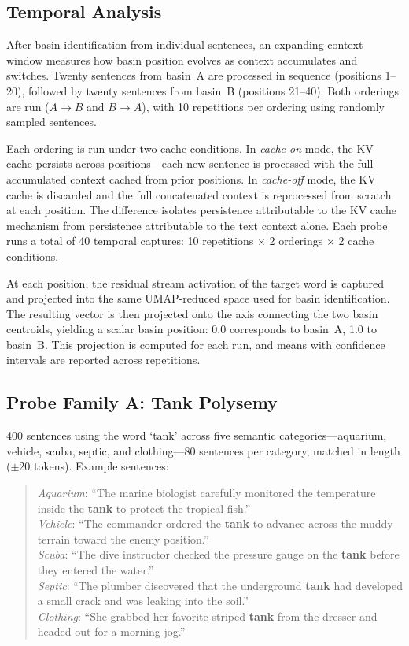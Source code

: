 \documentclass[11pt,a4paper]{article}
\begin{document}
\subsection{Temporal Analysis}

After basin identification from individual sentences, an expanding context window measures how basin position evolves as context accumulates and switches. Twenty sentences from basin~A are processed in sequence (positions 1--20), followed by twenty sentences from basin~B (positions 21--40). Both orderings are run ($A \to B$ and $B \to A$), with 10 repetitions per ordering using randomly sampled sentences.

Each ordering is run under two cache conditions. In \emph{cache-on} mode, the KV cache persists across positions---each new sentence is processed with the full accumulated context cached from prior positions. In \emph{cache-off} mode, the KV cache is discarded and the full concatenated context is reprocessed from scratch at each position. The difference isolates persistence attributable to the KV cache mechanism from persistence attributable to the text context alone. Each probe runs a total of 40 temporal captures: 10 repetitions $\times$ 2 orderings $\times$ 2 cache conditions.

At each position, the residual stream activation of the target word is captured and projected into the same UMAP-reduced space used for basin identification. The resulting vector is then projected onto the axis connecting the two basin centroids, yielding a scalar basin position: 0.0 corresponds to basin~A, 1.0 to basin~B. This projection is computed for each run, and means with confidence intervals are reported across repetitions.

\subsection{Probe Family A: Tank Polysemy}

400 sentences using the word `tank' across five semantic categories---aquarium, vehicle, scuba, septic, and clothing---80 sentences per category, matched in length ($\pm$20 tokens). Example sentences:

\begin{quote}
\small
\emph{Aquarium}: ``The marine biologist carefully monitored the temperature inside the \textbf{tank} to protect the tropical fish.''\\
\emph{Vehicle}: ``The commander ordered the \textbf{tank} to advance across the muddy terrain toward the enemy position.''\\
\emph{Scuba}: ``The dive instructor checked the pressure gauge on the \textbf{tank} before they entered the water.''\\
\emph{Septic}: ``The plumber discovered that the underground \textbf{tank} had developed a small crack and was leaking into the soil.''\\
\emph{Clothing}: ``She grabbed her favorite striped \textbf{tank} from the dresser and headed out for a morning jog.''
\end{quote}
\end{document}
